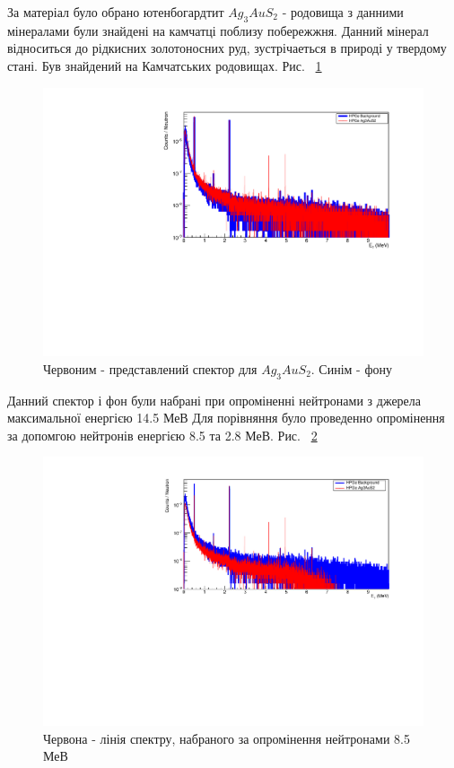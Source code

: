 \documentclass[a4paper, 14pt]{article}
\numberwithin{equation}{section}
\numberwithin{table}{section}
\begin{document}
	За матеріал було обрано ютенбогардтит $Ag_3AuS_2$ - родовища з данними мінералами були знайдені на камчатці поблизу побережжня. Данний мінерал відноситься до рідкисних золотоносних руд, зустрічаеться в природі у твердому стані. Був знайдений на Камчатських родовищах. Рис. ~\ref{ris:Ag3AuS2Fon}	
	\begin{figure}[hbt!]
		\centering \includegraphics[width=1\textwidth]{res/auFonAllLog.pdf}
		\caption{Червоним - представлений спектор для $Ag_3AuS_2$. Синім - фону} 
		\label{ris:Ag3AuS2Fon}	
	\end{figure} 	
	Данний спектор і фон були набрані при опроміненні нейтронами з джерела максимальної енергією 14.5 МеВ
	Для порівняння було проведенно опромінення за допомгою нейтронів енергією 8.5 та 2.8 МеВ. Рис. ~\ref{ris:Ag3AuS28_5MeV}
	\begin{figure}[hbt!]
		\centering \includegraphics[width=1\textwidth]{res/Ag3AuS2_8_5MeVFonClasic.pdf}
		\caption{Червона - лінія спектру, набраного за опромінення нейтронами 8.5 МеВ}
		\label{ris:Ag3AuS28_5MeV}	
	\end{figure} 	
\end{document}
